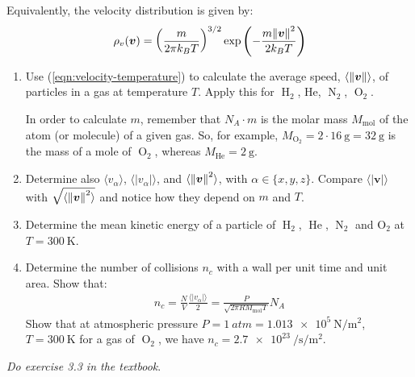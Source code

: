 \documentclass[../template.tex]{subfiles}
\begin{document}
Equivalently, the velocity distribution is given by:
\begin{align}\label{eqn:velocity-temperature}
    \rho_v(\bm{v}) = \left(\frac{m}{2 \pi k_B T} \right)^{3/2} \exp\left(-\frac{m \norm{\bm{v}}^2}{2k_B T} \right)
\end{align}

\begin{exo}
    \begin{enumerate}[label=\alph*.]
        \item Use (\ref{eqn:velocity-temperature}) to calculate the average speed, $\langle \norm{\bm{v}} \rangle$, of particles in a gas at temperature $T$. Apply this for $\operatorname{H}_2$, He, $\operatorname{N}_2$, $\operatorname{O}_2$. 
        
        In order to calculate $m$, remember that $N_A \cdot m$ is the molar mass $M_{\mathrm{mol}}$ of the atom (or molecule) of a given gas. So, for example, $M_{\operatorname{O}_2} = 2 \cdot \SI{16}{\g} = \SI{32}{\g}$ is the mass of a mole of $\operatorname{O}_2$, whereas $M_{\operatorname{He}} = \SI{2}{\g}$. 
        \item Determine also $\langle v_\alpha \rangle$, $\langle |v_\alpha| \rangle$, and $\langle \norm{\bm{v}}^2 \rangle$, with $\alpha \in \{x,y,z\}$. Compare $\langle |\bm{v}| \rangle$ with $\sqrt{\langle \norm{\bm{v}}^2 \rangle}$ and notice how they depend on $m$ and $T$.
        \item Determine the mean kinetic energy of a particle of $\operatorname{H}_2$, $\operatorname{He}$, $\operatorname{N}_2$ and O$_2$ at $T=\SI{300}{\K}$.
        \item Determine the number of collisions $n_c$ with a wall per unit time and unit area. Show that:
        \begin{align*}
            n_c = \frac{N}{V} \frac{\langle |v_\alpha| \rangle}{2} = \frac{P}{\sqrt{2 \pi R M_{\mathrm{mol} }T}} N_A   
        \end{align*}
        Show that at atmospheric pressure $P=\SI{1}{atm} = \SI{1.013e5}{\N\per\m\squared}$, $T=\SI{300}{\K}$ for a gas of $\operatorname{O}_2$, we have $n_c= \SI{2.7e23}{\per\s\per\m\squared}$.
    \end{enumerate}
\end{exo}

\begin{exo}
    \textit{Do exercise 3.3 in the textbook}. 
\end{exo}
\end{document}
